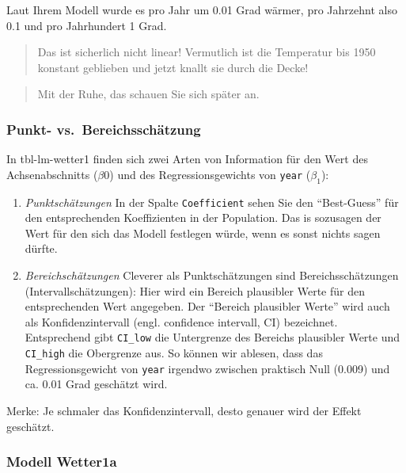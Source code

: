 \documentclass[
  letterpaper,
]{scrbook}
\theoremstyle{definition}
\theoremstyle{definition}
\theoremstyle{definition}
\theoremstyle{remark}
\begin{document}
Laut Ihrem Modell wurde es pro Jahr um 0.01 Grad wärmer, pro Jahrzehnt
also 0.1 und pro Jahrhundert 1 Grad.

\begin{quote}
{} Das ist sicherlich nicht linear! Vermutlich ist die
Temperatur bis 1950 konstant geblieben und jetzt knallt sie durch die
Decke!
\end{quote}

\begin{quote}
{} Mit der Ruhe, das schauen Sie sich später an.
\end{quote}

\subsubsection{Punkt-
vs.~Bereichsschätzung}\label{punkt--vs.-bereichsschuxe4tzung}

In tbl-lm-wetter1 finden sich zwei Arten von Information für den Wert
des Achsenabschnitts (\(\beta 0\)) und des Regressionsgewichts von
\texttt{year} (\(\beta _1\)):

\begin{enumerate}
\def\labelenumi{\arabic{enumi}.}
\item
  \emph{Punktschätzungen} In der Spalte \texttt{Coefficient} sehen Sie
  den \enquote{Best-Guess} für den entsprechenden Koeffizienten in der
  Population. Das is sozusagen der Wert für den sich das Modell
  festlegen würde, wenn es sonst nichts sagen dürfte.
\item
  \emph{Bereichschätzungen} Cleverer als Punktschätzungen sind
  Bereichsschätzungen (Intervallschätzungen): Hier wird ein Bereich
  plausibler Werte für den entsprechenden Wert angegeben. Der
  \enquote{Bereich plausibler Werte} wird auch als Konfidenzintervall
  (engl. confidence intervall, CI) bezeichnet. Entsprechend gibt
  \texttt{CI\_low} die Untergrenze des Bereichs plausibler Werte und
  \texttt{CI\_high} die Obergrenze aus. So können wir ablesen, dass das
  Regressionsgewicht von \texttt{year} irgendwo zwischen praktisch Null
  (0.009) und ca. 0.01 Grad geschätzt wird.
\end{enumerate}

Merke: Je schmaler das Konfidenzintervall, desto genauer wird der Effekt
geschätzt.

\subsubsection{Modell Wetter1a}\label{modell-wetter1a}
\end{document}
